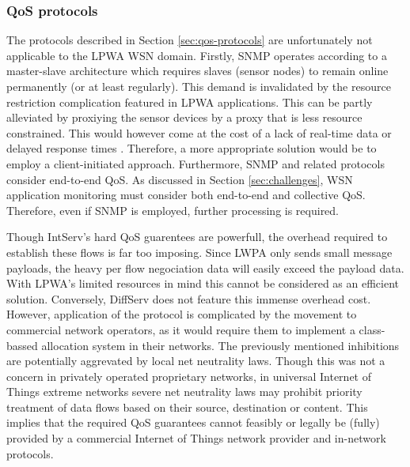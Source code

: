\subsubsection{QoS protocols}
The protocols described in Section \ref{sec:qos-protocols} are unfortunately not applicable to the LPWA WSN domain. Firstly, SNMP operates according to a master-slave architecture which requires slaves (sensor nodes) to remain online permanently (or at least regularly)\cite{snmp_server_initiated}. This demand is invalidated by the resource restriction complication featured in LPWA applications. This can be partly alleviated by proxiying the sensor devices by a proxy that is less resource constrained. This would however come at the cost of a lack of real-time data or delayed response times \cite{snmp_proxy}. Therefore, a more appropriate solution would be to employ a client-initiated approach. Furthermore, SNMP and related protocols consider end-to-end QoS. As discussed in Section \ref{sec:challenges}, WSN application monitoring must consider both end-to-end and collective QoS. Therefore, even if SNMP is employed, further processing is required.

Though IntServ's hard QoS guarentees are powerfull, the overhead required to establish these flows is far too imposing. Since LWPA only sends small message payloads, the heavy per flow negociation data will easily exceed the payload data. With LPWA's limited resources in mind this cannot be considered as an efficient solution. Conversely, DiffServ does not feature this immense overhead cost. However, application of the protocol is complicated by the movement to commercial network operators, as it would require them to implement a class-bassed allocation system in their networks. The previously mentioned inhibitions are potentially aggrevated by local net neutrality laws. Though this was not a concern in privately operated proprietary networks, in universal Internet of Things extreme networks severe net neutrality laws may prohibit priority treatment of data flows based on their source, destination or content.\cite{net-neutrality} This implies that the required QoS guarantees cannot feasibly or legally be (fully) provided by a commercial Internet of Things network provider and in-network protocols. 

